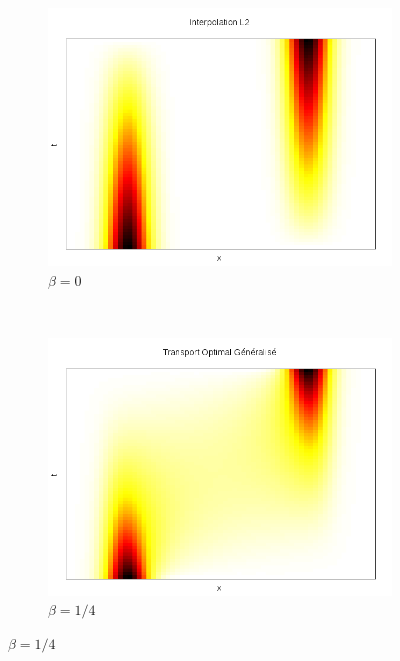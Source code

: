 \documentclass{beamer}
\begin{document}
\begin{frame}
\begin{figure}[!h]
\centering 
	\begin{subfigure}[b]{0.48\linewidth}
	\includegraphics[width=\textwidth]{img/1DGeneralise/transport0.png}
	\caption{$\beta = 0$}
	\end{subfigure}
	~
	\begin{subfigure}[b]{0.48\linewidth}
	\includegraphics[width=\textwidth]{img/1DGeneralise/transport25.png}
	\caption{$\beta = 1/4$}
	\end{subfigure}	
	

\end{figure}
\end{frame}
\end{document}
